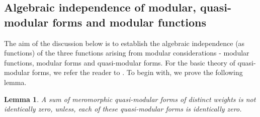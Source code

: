 \documentclass[11pt, reqno]{amsart}
\newtheorem{lemma}[theorem]{Lemma}
\begin{document}
\subsection{Algebraic independence of modular, quasi-modular forms and modular functions} 

The aim of the discussion below is to establish the algebraic independence (as functions) of the three functions arising from modular considerations - modular functions, modular forms and quasi-modular forms. For the basic theory of quasi-modular forms, we refer the reader to \cite{royer}. To begin with, we prove the following lemma.
\begin{lemma}\label{indep}
A sum of meromorphic quasi-modular forms of distinct weights is not identically zero, unless, each of these quasi-modular forms is identically zero.
\end{lemma}
\end{document}
